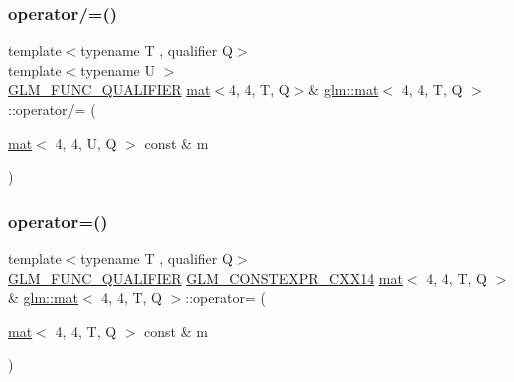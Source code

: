\subsubsection{\texorpdfstring{operator/=()}{operator/=()}\hspace{0.1cm}{\footnotesize\ttfamily [4/4]}}
{\footnotesize\ttfamily template$<$typename T , qualifier Q$>$ \\
template$<$typename U $>$ \\
\mbox{\hyperlink{setup_8hpp_a33fdea6f91c5f834105f7415e2a64407}{G\+L\+M\+\_\+\+F\+U\+N\+C\+\_\+\+Q\+U\+A\+L\+I\+F\+I\+ER}} \mbox{\hyperlink{structglm_1_1mat}{mat}}$<$4, 4, T, Q$>$\& \mbox{\hyperlink{structglm_1_1mat}{glm\+::mat}}$<$ 4, 4, T, Q $>$\+::operator/= (\begin{DoxyParamCaption}\item[{\mbox{\hyperlink{structglm_1_1mat}{mat}}$<$ 4, 4, U, Q $>$ const \&}]{m }\end{DoxyParamCaption})}

\mbox{\label{structglm_1_1mat_3_014_00_014_00_01_t_00_01_q_01_4_a4319e1de5928bc4747e149b160ba5d9a}} 
\subsubsection{\texorpdfstring{operator=()}{operator=()}\hspace{0.1cm}{\footnotesize\ttfamily [1/3]}}
{\footnotesize\ttfamily template$<$typename T , qualifier Q$>$ \\
\mbox{\hyperlink{setup_8hpp_a33fdea6f91c5f834105f7415e2a64407}{G\+L\+M\+\_\+\+F\+U\+N\+C\+\_\+\+Q\+U\+A\+L\+I\+F\+I\+ER}} \mbox{\hyperlink{setup_8hpp_a4dd12abf5e1164bc57f3a34671d03844}{G\+L\+M\+\_\+\+C\+O\+N\+S\+T\+E\+X\+P\+R\+\_\+\+C\+X\+X14}} \mbox{\hyperlink{structglm_1_1mat}{mat}}$<$ 4, 4, T, Q $>$ \& \mbox{\hyperlink{structglm_1_1mat}{glm\+::mat}}$<$ 4, 4, T, Q $>$\+::operator= (\begin{DoxyParamCaption}\item[{\mbox{\hyperlink{structglm_1_1mat}{mat}}$<$ 4, 4, T, Q $>$ const \&}]{m }\end{DoxyParamCaption})}

\mbox{\label{structglm_1_1mat_3_014_00_014_00_01_t_00_01_q_01_4_a240690716d4c5dc0b562b051b5fc71af}} 
